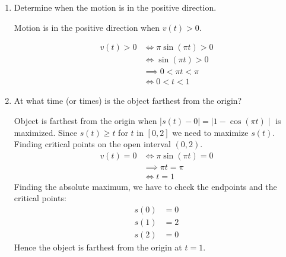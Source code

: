 \documentclass[nooutcomes]{ximera}
\begin{document}
\begin{problem}
\begin{enumerate}
	\item Determine when the motion is in the positive direction.
	
	
	\begin{freeResponse}	
	Motion is in the positive direction when $v(t)>0$.
	
	\begin{align*}
	v(t)>0 & \iff \pi \sin(\pi t)>0\\
	& \iff \sin(\pi t)>0\\
	& \implies 0<\pi t <\pi\\
	& \iff 0<t<1	
	\end{align*}
	\end{freeResponse}
	

	\item At what time (or times) is the object farthest from the origin?

	\begin{freeResponse}	
	Object is farthest from the origin when $\mid{s(t)-0}\mid=\mid{1-\cos(\pi t)}\mid$ is maximized.  Since $s(t) \ge t$ for $t$ in $[0,2]$ we need to maximize $s(t)$.
	Finding critical points on the open interval $(0,2)$.
	\begin{align*}
	v(t)=0 &\iff \pi\sin(\pi t)=0\\
	&\implies \pi t=\pi\\
	&\iff t=1
	\end{align*}
	Finding the absolute maximum, we have to check the endpoints and the critical points:
	\begin{align*}
	s(0)&=0\\
	s(1)&=2\\
	s(2)&=0
	\end{align*}
	Hence the object is farthest from the origin at $t=1$.
	
	\end{freeResponse}



\end{enumerate}

\end{problem}
\end{document}
